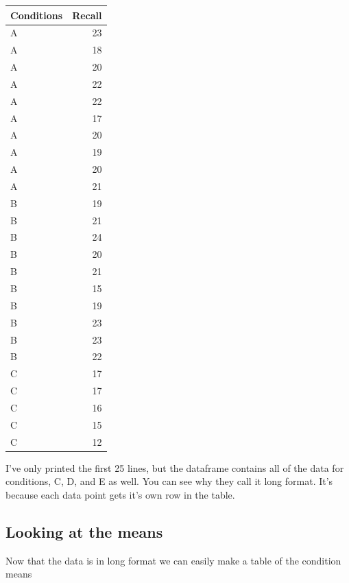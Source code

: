 \begin{tabular}{l|r}
\hline
Conditions & Recall\\
\hline
A & 23\\
\hline
A & 18\\
\hline
A & 20\\
\hline
A & 22\\
\hline
A & 22\\
\hline
A & 17\\
\hline
A & 20\\
\hline
A & 19\\
\hline
A & 20\\
\hline
A & 21\\
\hline
B & 19\\
\hline
B & 21\\
\hline
B & 24\\
\hline
B & 20\\
\hline
B & 21\\
\hline
B & 15\\
\hline
B & 19\\
\hline
B & 23\\
\hline
B & 23\\
\hline
B & 22\\
\hline
C & 17\\
\hline
C & 17\\
\hline
C & 16\\
\hline
C & 15\\
\hline
C & 12\\
\hline
\end{tabular}

I've only printed the first 25 lines, but the dataframe contains all of
the data for conditions, C, D, and E as well. You can see why they call
it long format. It's because each data point gets it's own row in the
table.

\subsection{Looking at the means}\label{looking-at-the-means}

Now that the data is in long format we can easily make a table of the
condition means

\begin{Shaded}
\begin{Highlighting}[]
\NormalTok{)}
\end{Highlighting}
\end{Shaded}

